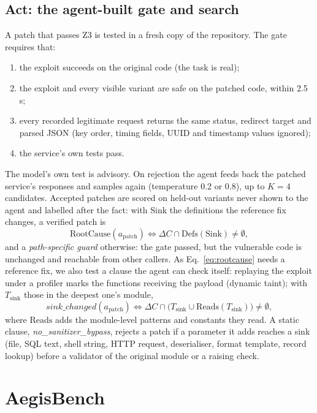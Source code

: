 \documentclass[10pt,a4paper]{article}
\begin{document}
\subsection{Act: the agent-built gate and search}\label{sec:act}
A patch that passes Z3 is tested in a fresh copy of the repository. The gate requires that:
\begin{enumerate}
\item the exploit succeeds on the original code (the task is real);
\item the exploit and every visible variant are safe on the patched code, within 2.5\,s;
\item every recorded legitimate request returns the same status, redirect target and parsed JSON (key order, timing fields, UUID and timestamp values ignored);
\item the service's own tests pass.
\end{enumerate}
The model's own test is advisory. On rejection the agent feeds back the patched service's responses and samples again (temperature 0.2 or 0.8), up to $K = 4$ candidates. Accepted patches are scored on held-out variants never shown to the agent and labelled after the fact: with $\mathrm{Sink}$ the definitions the reference fix changes, a verified patch is
\begin{equation}
\mathrm{RootCause}(a_{\mathrm{patch}}) \iff \Delta C \cap \mathrm{Defs}(\mathrm{Sink}) \neq \emptyset,\label{eq:rootcause}
\end{equation}
and a \emph{path-specific guard} otherwise: the gate passed, but the vulnerable code is unchanged and reachable from other callers. As Eq.~\ref{eq:rootcause} needs a reference fix, we also test a clause the agent can check itself: replaying the exploit under a profiler marks the functions receiving the payload (dynamic taint); with $T_{\mathrm{sink}}$ those in the deepest one's module,
\begin{equation}
\mathit{sink\_changed}(a_{\mathrm{patch}}) \iff \Delta C \cap \big(T_{\mathrm{sink}} \cup \mathrm{Reads}(T_{\mathrm{sink}})\big) \neq \emptyset,\label{eq:taint}
\end{equation}
where $\mathrm{Reads}$ adds the module-level patterns and constants they read. A static clause, \emph{no\_sanitizer\_bypass}, rejects a patch if a parameter it adds reaches a sink (file, SQL text, shell string, HTTP request, deserialiser, format template, record lookup) before a validator of the original module or a raising check.

\section{AegisBench}\label{sec:bench}
\end{document}
